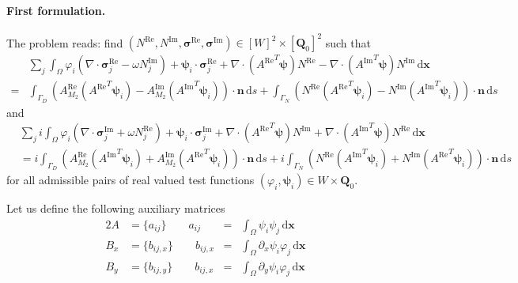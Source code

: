 \documentclass[11pt,a4paper]{article}
\begin{document}
\paragraph{First formulation.} The problem reads: find $(N^\mathrm{Re},N^\mathrm{Im},\boldsymbol{\sigma}^\mathrm{Re},\boldsymbol{\sigma}^\mathrm{Im})\in [W]^2\times [\mathbf{Q}_0]^2$ such that
\begin{align}
&\sum_j\int_\Omega \varphi_i\left(\nabla\cdot\boldsymbol{\sigma}_j^\mathrm{Re}-\omega N^\mathrm{Im}_j\right)+
\boldsymbol{\psi}_i\cdot\boldsymbol{\sigma}^\mathrm{Re}_j+
\nabla\cdot({A^\mathrm{Re}}^T\boldsymbol{\psi})N^\mathrm{Re}-
\nabla\cdot({A^\mathrm{Im}}^T\boldsymbol{\psi})N^\mathrm{Im}
\,\mathrm{d}\mathbf{x}\\
=&
\int_{\Gamma_D}\left(A^\mathrm{Re}_{M_2}({A^\mathrm{Re}}^T\boldsymbol{\psi}_i)-
A^\mathrm{Im}_{M_2}({A^\mathrm{Im}}^T\boldsymbol{\psi}_i)
\right)\cdot\mathbf{n}\,\mathrm{d}s
+
\int_{\Gamma_N}\left(N^\mathrm{Re}({A^\mathrm{Re}}^T\boldsymbol{\psi}_i)-
N^\mathrm{Im}({A^\mathrm{Im}}^T\boldsymbol{\psi}_i)
\right)\cdot\mathbf{n}\,\mathrm{d}s
\end{align}
and
\begin{align}
&\sum_ji\int_\Omega \varphi_i\left(\nabla\cdot\boldsymbol{\sigma}_j^\mathrm{Im}+\omega N^\mathrm{Re}_j\right)+
\boldsymbol{\psi}_i\cdot\boldsymbol{\sigma}^\mathrm{Im}_j+
\nabla\cdot({A^\mathrm{Re}}^T\boldsymbol{\psi})N^\mathrm{Im}+
\nabla\cdot({A^\mathrm{Im}}^T\boldsymbol{\psi})N^\mathrm{Re}
\,\mathrm{d}\mathbf{x}\\
&=
i\int_{\Gamma_D}\left(A^\mathrm{Re}_{M_2}({A^\mathrm{Im}}^T\boldsymbol{\psi}_i)+
A^\mathrm{Im}_{M_2}({A^\mathrm{Re}}^T\boldsymbol{\psi}_i)
\right)\cdot\mathbf{n}\,\mathrm{d}s
+
i\int_{\Gamma_N}\left(N^\mathrm{Re}({A^\mathrm{Im}}^T\boldsymbol{\psi}_i)+
N^\mathrm{Im}({A^\mathrm{Re}}^T\boldsymbol{\psi}_i)
\right)\cdot\mathbf{n}\,\mathrm{d}s
\end{align}
for all admissible pairs of real valued test functions $(\varphi_i,\boldsymbol{\psi}_i)\in W\times\mathbf{Q}_0$.

Let us define the following auxiliary matrices
\begin{alignat}{2}
A&=\{a_{ij}\} \qquad a_{ij}&=&\int_\Omega \psi_i\psi_j\,\mathrm{d}\mathbf{x}\\
B_x&=\{b_{ij,x}\} \qquad b_{ij,x}&=&\int_\Omega \partial_x\psi_i\varphi_j\,\mathrm{d}\mathbf{x}\\
B_y&=\{b_{ij,y}\} \qquad b_{ij,x}&=&\int_\Omega \partial_y\psi_i\varphi_j\,\mathrm{d}\mathbf{x}
\end{alignat}
\end{document}
